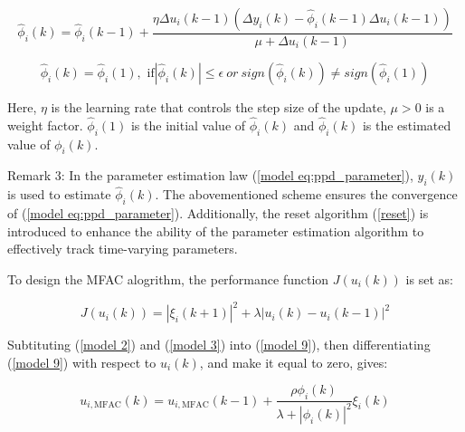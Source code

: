 \documentclass[journal,onecolumn]{IEEEtran}
\begin{document}





\begin{equation}
    \label{model eq:ppd_parameter}
    \hat{\phi}_i(k) = \hat{\phi}_i(k-1) + \frac{\eta \Delta u_i(k-1) (\Delta y_i(k) - \hat{\phi}_i(k-1) \Delta u_i(k-1))}{\mu + \Delta u_i(k-1)}
\end{equation}

\begin{equation}
    \label{reset}
    \hat{\phi}_i(k) = \hat{\phi}_i(1),  \text{    if}  |\hat{\phi}_i(k) | \leq \epsilon \ or \ sign(\hat{\phi}_i(k)) \neq  sign(\hat{\phi}_i(1))
\end{equation}

Here, $\eta$ is the learning rate that controls the step size of the update, $\mu > 0$ is a weight factor. $ \hat{\phi}_i(1) $ is the initial value of $ \hat{\phi}_i(k)$ and $ \hat{\phi}_i(k)$ is the estimated value of $ \phi_i(k)$.

Remark 3: In the parameter estimation law (\ref{model eq:ppd_parameter}), $y_i(k) $ is used to estimate $\hat{\phi}_i(k)$. The abovementioned scheme ensures the convergence of (\ref{model eq:ppd_parameter}). Additionally, the reset algorithm (\ref{reset}) is introduced to enhance the ability of the parameter estimation algorithm to effectively track time-varying parameters.


To design the MFAC alogrithm, the performance function \(J(u_i(k))\) is set as:

\begin{equation}
    \label{model 9}
    J(u_i(k)) = |\xi_i(k+1)|^2 + \lambda|u_i(k) - u_i(k-1)|^2
\end{equation}

Subtituting (\ref{model 2}) and (\ref{model 3}) into (\ref{model 9}), then differentiating (\ref{model 9}) with respect to \(u_i(k)\), and make it equal to zero, gives:

\begin{equation}
    \label{model eq:mfac}
    u_{i,\text{MFAC}}(k) = u_{i,\text{MFAC}}(k - 1) + \frac{\rho \phi_i(k)}{\lambda + |\phi_i(k)|^2} \xi_i(k)
\end{equation}
\end{document}
